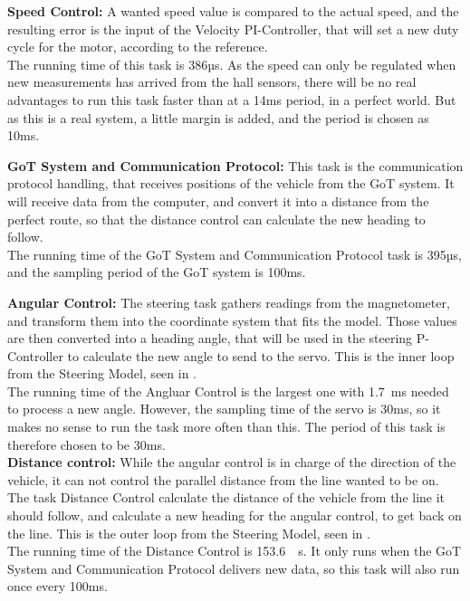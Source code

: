 \textbf{Speed Control:}
A wanted speed value is compared to the actual speed, and the resulting error is the input of the Velocity PI-Controller, that will set a new duty cycle for the motor, according to the reference.\\
The running time of this task is 386µs. As the speed can only be regulated when new measurements has arrived from the hall sensors, there will be no real advantages to run this task faster than at a 14ms period, in a perfect world. But as this is a real system, a little margin is added, and the period is chosen as 10ms. 

\textbf{GoT System and Communication Protocol:}
This task is the communication protocol handling, that receives positions of the vehicle from the GoT system. It will receive data from the computer, and convert it into a distance from the perfect route, so that the distance control can calculate the new heading to follow.\\
The running time of the GoT System and Communication Protocol task is 395µs, and the sampling period of the GoT system is 100ms.

\textbf{Angular Control:}
The steering task gathers readings from the magnetometer, and transform them into the coordinate system that fits the model. Those values are then converted into a heading angle, that will be used in the steering P-Controller to calculate the new angle to send to the servo. This is the inner loop from the Steering Model, seen in .\\
The running time of the Angluar Control is the largest one with \SI{1.7}{ms} needed to process a new angle. However, the sampling time of the servo is 30ms, so it makes no sense to run the task more often than this. The period of this task is therefore chosen to be 30ms.\\

\textbf{Distance control:}
While the angular control is in charge of the direction of the vehicle, it can not control the parallel distance from the line wanted to be on. The task Distance Control calculate the distance of the vehicle from the line it should follow, and calculate a new heading for the angular control, to get back on the line. This is the outer loop from the Steering Model, seen in .\\
The running time of the Distance Control is \SI{153.6}{\mu s}. It only runs when the GoT System and Communication Protocol delivers new data, so this task will also run once every 100ms.

